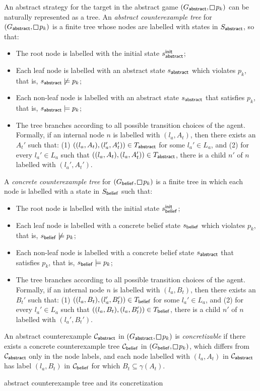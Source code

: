 An abstract strategy for the target in the abstract game $(G_\abstr,\LTLglobally p_k)$ can be naturally represented as a tree. 
An \emph{abstract counterexample tree} for $(G_\abstr,\LTLglobally p_k)$ is a finite tree  whose nodes are labelled with states in $S_{\mathsf{abstract}}$, so that:
\begin{itemize}
\item The root node is labelled with the initial state $s_{\mathsf{abstract}}^{\mathsf{init}}$;
\item Each leaf node is labelled with an abstract state $s_{\mathsf{abstract}}$ which violates $p_k$, that is, $s_{\mathsf{abstract}} \not\models p_k$;
\item Each non-leaf node is labelled with an abstract state $s_{\mathsf{abstract}}$ that satisfies $p_k$, that is, $s_{\mathsf{abstract}} \models p_k$; 
\item The tree branches according to all possible transition choices of the agent. Formally, if an internal node $n$ is labelled with $(l_a,A_t)$, then there exists an $A_t'$  such that: (1) $((l_a,A_t),(l_a',A_t')) \in T_{\mathsf{abstract}}$ for some $l_a' \in L_a$, and (2) for every $l_a' \in L_a$ such that $((l_a,A_t),(l_a,A_t')) \in T_{\mathsf{abstract}}$, there is a child $n'$ of $n$ labelled with $(l_a',A_t')$.
\end{itemize}

A \emph{concrete counterexample tree} for $(G_\belief,\LTLglobally p_k)$ is a finite tree in which each node is labelled with a state in $S_{\mathsf{belief}}$ such that:
\begin{itemize}
\item The root node is labelled with the initial state $s_{\mathsf{belief}}^{\mathsf{init}}$;
\item Each leaf node is labelled with a concrete belief state $s_{\mathsf{belief}}$ which violates $p_k$, that is, $s_{\mathsf{belief}} \not\models p_k$;
\item Each non-leaf node is labelled with a concrete belief state $s_{\mathsf{abstract}}$ that satisfies $p_k$, that is, $s_{\mathsf{belief}} \models p_k$; 
\item The tree branches according to all possible transition choices of the agent. Formally, if an internal node $n$ is labelled with $(l_a,B_t)$, then there exists an $B_t'$  such that: (1) $((l_a,B_t),(l_a',B_t')) \in T_{\mathsf{belief}}$ for some $l_a' \in L_a$, and (2) for every $l_a' \in L_a$ such that $((l_a,B_t),(l_a,B_t')) \in T_{\mathsf{belief}}$, there is a child $n'$ of $n$ labelled with $(l_a',B_t')$.
\end{itemize}

An abstract counterexample $\mathcal{C}_{\mathsf{abstract}}$ in $(G_\abstr,\LTLglobally p_k)$ is \emph{concretizable} if there exists a concrete counterexample 
tree $\mathcal{C}_{\mathsf{belief}}$ in $(G_\belief,\LTLglobally p_k)$, which differs from $\mathcal{C}_{\mathsf{abstract}}$ only in the node labels, and each node labelled with $(l_a,A_t)$ in $\mathcal{C}_{\mathsf{abstract}}$ has label $(l_a, B_t)$ in $\mathcal{C}_{\mathsf{belief}}$ for which $B_t \subseteq \gamma(A_t)$.
 
\begin{example}
 abstract counterexample tree and its concretization
\end{example}
